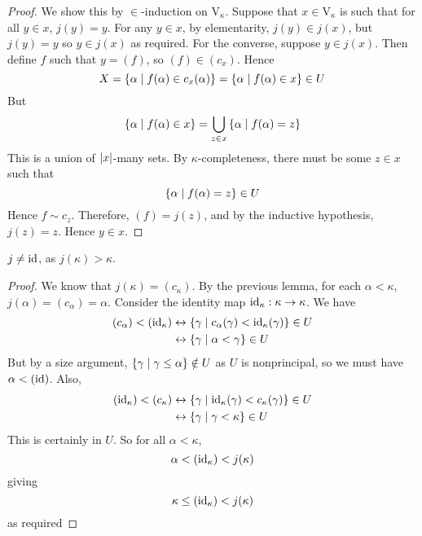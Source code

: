 \begin{proof}
    We show this by \( \in \)-induction on \( \mathrm{V}_\kappa \).
    Suppose that \( x \in \mathrm{V}_\kappa \) is such that for all \( y \in x \), \( j(y) = y \).
    For any \( y \in x \), by elementarity, \( j(y) \in j(x) \), but \( j(y) = y \) so \( y \in j(x) \) as required.
    For the converse, suppose \( y \in j(x) \).
    Then define \( f \) such that \( y = (f) \), so \( (f) \in (c_x) \).
    Hence
    \[ X = \qty{\alpha \mid f(\alpha) \in c_x(\alpha)} = \qty{\alpha \mid f(\alpha) \in x} \in U \]
    But
    \[ \qty{\alpha \mid f(\alpha) \in x} = \bigcup_{z \in x} \qty{\alpha \mid f(\alpha) = z} \]
    This is a union of \( \abs{x} \)-many sets.
    By \( \kappa \)-completeness, there must be some \( z \in x \) such that
    \[ \qty{\alpha \mid f(\alpha) = z} \in U \]
    Hence \( f \sim c_z \).
    Therefore, \( (f) = j(z) \), and by the inductive hypothesis, \( j(z) = z \).
    Hence \( y \in x \).
\end{proof}
\begin{lemma}
    \( j \neq \operatorname{id} \), as \( j(\kappa) > \kappa \).
\end{lemma}
\begin{proof}
    We know that \( j(\kappa) = (c_\kappa) \).
    By the previous lemma, for each \( \alpha < \kappa \), \( j(\alpha) = (c_\alpha) = \alpha \).
    Consider the identity map \( \operatorname{id}_\kappa : \kappa \to \kappa \).
    We have
    \begin{align*}
        (c_\alpha) < (\operatorname{id}_\kappa) &\leftrightarrow \qty{\gamma \mid c_\alpha(\gamma) < \operatorname{id}_\kappa(\gamma)} \in U \\
        &\leftrightarrow \qty{\gamma \mid \alpha < \gamma} \in U
    \end{align*}
    But by a size argument, \( \qty{\gamma \mid \gamma \leq \alpha} \notin U \) as \( U \) is nonprincipal, so we must have \( \alpha < (\operatorname{id}) \).
    Also,
    \begin{align*}
        (\operatorname{id}_\kappa) < (c_\kappa) &\leftrightarrow \qty{\gamma \mid \operatorname{id}_\kappa(\gamma) < c_\kappa(\gamma)} \in U \\
        &\leftrightarrow \qty{\gamma \mid \gamma < \kappa} \in U
    \end{align*}
    This is certainly in \( U \).
    So for all \( \alpha < \kappa \),
    \[ \alpha < (\operatorname{id}_\kappa) < j(\kappa) \]
    giving
    \[ \kappa \leq (\operatorname{id}_\kappa) < j(\kappa) \]
    as required
\end{proof}
